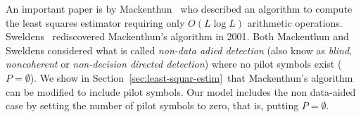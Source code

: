 \documentclass[journal]{IEEEtran}
\begin{document}

An important paper is by Mackenthun~\cite{Mackenthun1994} who described an algorithm to compute the least squares estimator requiring only $O(L \log L)$ arithmetic operations.  Sweldens~\cite{Sweldens2001} rediscovered Mackenthun's algorithm in 2001.  Both Mackenthun and Sweldens considered what is called \emph{non-data adied detection} (also know as \emph{blind}, \emph{noncoherent} or \emph{non-decision directed detection}) where no pilot symbols exist ($P = \emptyset$).  We show in Section~\ref{sec:least-squar-estim}~that Mackenthun's algorithm can be modified to include pilot symbols. Our model includes the non data-aided case by setting the number of pilot symbols to zero, that is, putting $P = \emptyset$.
\end{document}
